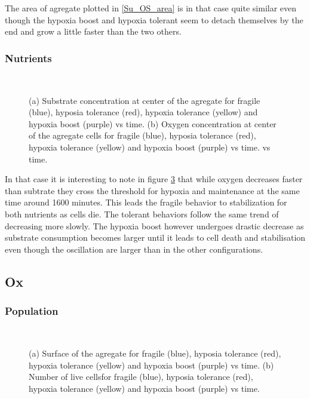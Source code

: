 \documentclass[11pt,a4paper]{article}
\begin{document}
The area of agregate plotted in \ref{Su_OS_area} is in that case quite similar even though the hypoxia boost and hypoxia tolerant seem to detach themselves by the end and grow a little faster than the two others.\\





\subsubsection{Nutrients}
\begin{figure}[h]
\begin{subfigure}{0.5\textwidth}
	\centering
	
	\caption{ \label{Su_OS_S_ctr}}
\end{subfigure}
~~
\begin{subfigure}{0.5\textwidth}
	\centering
	
	\caption{\label{Su_OS_O_ctr}}
\end{subfigure}
\caption{(a) Substrate concentration at center of the agregate for fragile (blue), hyposia tolerance (red), hypoxia tolerance (yellow) and hypoxia boost (purple) vs time. (b) Oxygen concentration at center of the agregate cells for fragile (blue), hyposia tolerance (red), hypoxia tolerance (yellow) and hypoxia boost (purple) vs time. vs time. \label{Su_OS_SO_ctr}}
\end{figure}

In that case it is interesting to note in figure \ref{Su_OS_SO_ctr} that while oxygen decreases faster than subtrate they cross the threshold for hypoxia and maintenance at the same time around 1600 minutes. This leads the fragile behavior to stabilization for both nutrients as cells die. The tolerant behaviors follow the same trend of decreasing more slowly. The hypoxia boost however undergoes drastic decrease as substrate consumption becomes larger until it leads to cell death and stabilisation even though the oscillation are larger than in the other configurations.\\

\newpage
\subsection{Ox}
\subsubsection{Population}
\begin{figure}[h]
\begin{subfigure}{0.5\textwidth}
	\centering
	
	\caption{ \label{Ox_OS_area}}
\end{subfigure}
~~
\begin{subfigure}{0.5\textwidth}
	\centering
	
	\caption{\label{Ox_OS_live}}
\end{subfigure}
\caption{(a) Surface of the agregate for fragile (blue), hyposia tolerance (red), hypoxia tolerance (yellow) and hypoxia boost (purple) vs time. (b) Number of live cellsfor fragile (blue), hyposia tolerance (red), hypoxia tolerance (yellow) and hypoxia boost (purple) vs time. \label{Ox_OS_area_live}}
\end{figure}
\end{document}
